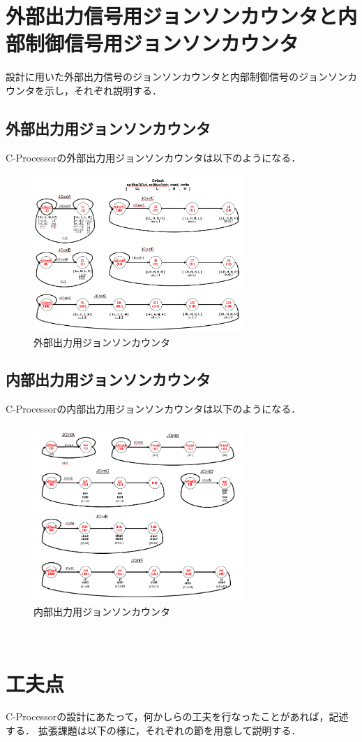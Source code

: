 \documentclass[dvipdfmx]{jarticle}
\begin{document}
\section{外部出力信号用ジョンソンカウンタと内部制御信号用ジョンソンカウンタ}
設計に用いた外部出力信号のジョンソンカウンタと内部制御信号のジョンソンカウンタを示し，それぞれ説明する．
\clearpage
\subsection{外部出力用ジョンソンカウンタ}
C-Processorの外部出力用ジョンソンカウンタは以下のようになる．
\begin{figure}[h]
  \centering
  \includegraphics[width = 8cm]{ext.png}
  \caption{外部出力用ジョンソンカウンタ}
\end{figure}
\subsection{内部出力用ジョンソンカウンタ}
C-Processorの内部出力用ジョンソンカウンタは以下のようになる．
\begin{figure}[h]
  \centering
  \includegraphics[width = 8cm]{int.png}
  \caption{内部出力用ジョンソンカウンタ}
\end{figure}
~\\
\section{工夫点}
C-Processorの設計にあたって，何かしらの工夫を行なったことがあれば，記述する．
拡張課題は以下の様に，それぞれの節を用意して説明する．
\end{document}
